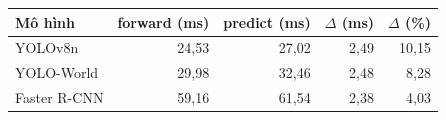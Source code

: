 \begin{tabular}{lrrrr}
\toprule
Mô hình & forward (ms) & predict (ms) & $\Delta$ (ms) & $\Delta$ (\%) \\
\midrule
YOLOv8n & 24{,}53 & 27{,}02 & 2{,}49 & 10{,}15 \\
YOLO-World & 29{,}98 & 32{,}46 & 2{,}48 & 8{,}28 \\
Faster R-CNN & 59{,}16 & 61{,}54 & 2{,}38 & 4{,}03 \\
\bottomrule
\end{tabular}
